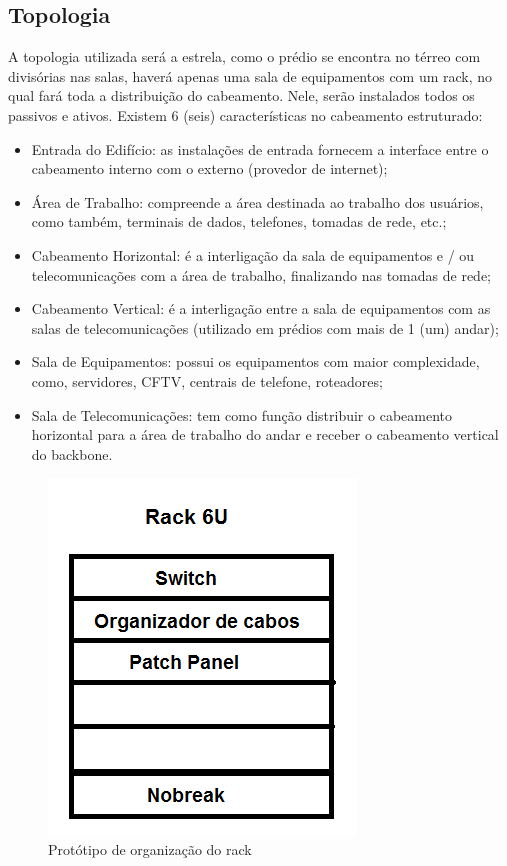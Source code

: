 \documentclass[	DIV=calc,%
							paper=a4,%
							fontsize=12pt,%
							onecolumn]{scrartcl}	 					%
\begin{document}
\subsection{Topologia}
A topologia utilizada será a estrela, como o prédio se encontra no térreo com divisórias nas salas, haverá apenas uma sala de equipamentos com um rack, no qual fará toda a distribuição do cabeamento. Nele, serão instalados todos os passivos e ativos.
Existem 6 (seis) características no cabeamento estruturado:
\begin{itemize}
	\item Entrada do Edifício: as instalações de entrada fornecem a interface entre o cabeamento interno com o externo (provedor de internet);
	\item Área de Trabalho: compreende a área destinada ao trabalho dos usuários, como também, terminais de dados, telefones, tomadas de rede, etc.;
	\item Cabeamento Horizontal: é a interligação da sala de equipamentos e / ou telecomunicações com a área de trabalho, finalizando nas tomadas de rede;
	\item Cabeamento Vertical: é a interligação entre a sala de equipamentos com as salas de telecomunicações (utilizado em prédios com mais de 1 (um) andar);
	\item Sala de Equipamentos: possui os equipamentos com maior complexidade, como, servidores, CFTV, centrais de telefone, roteadores;
	\item Sala de Telecomunicações: tem como função distribuir o cabeamento horizontal para a área de trabalho do andar e receber o cabeamento vertical do backbone.
\end{itemize}

\begin{figure}[H]
	\centering
	\includegraphics[scale=0.5]{rack}
	\caption{Protótipo de organização do rack}
	\label{rack}
\end{figure}
\end{document}
